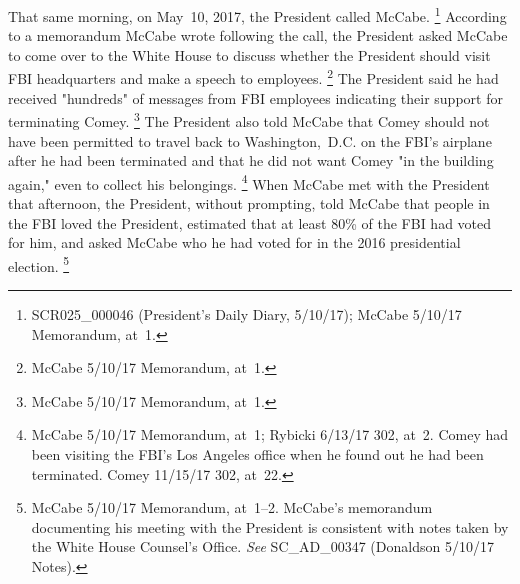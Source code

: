 That same morning, on May~10, 2017, the President called McCabe.%
\footnote{SCR025\_000046 (President's Daily Diary, 5/10/17);
McCabe 5/10/17 Memorandum, at~1.}
According to a memorandum McCabe wrote following the call, the President asked McCabe to come over to the White House to discuss whether the President should visit FBI headquarters and make a speech to employees.%
\footnote{McCabe 5/10/17 Memorandum, at~1.}
The President said he had received "hundreds" of messages from FBI employees indicating their support for terminating Comey.%
\footnote{McCabe 5/10/17 Memorandum, at~1.}
The President also told McCabe that Comey should not have been permitted to travel back to Washington,~D.C. on the FBI's airplane after he had been terminated and that he did not want Comey "in the building again," even to collect his belongings.%
\footnote{McCabe 5/10/17 Memorandum, at~1;
Rybicki 6/13/17 302, at~2.
Comey had been visiting the FBI's Los Angeles office when he found out he had been terminated.
Comey 11/15/17 302, at~22.}
When McCabe met with the President that afternoon, the President, without prompting, told McCabe that people in the FBI loved the President, estimated that at least 80\% of the FBI had voted for him, and asked McCabe who he had voted for in the 2016 presidential election.%
\footnote{McCabe 5/10/17 Memorandum, at~1--2.
McCabe's memorandum documenting his meeting with the President is consistent with notes taken by the White House Counsel's Office.
\textit{See} SC\_AD\_00347 (Donaldson 5/10/17 Notes).}


